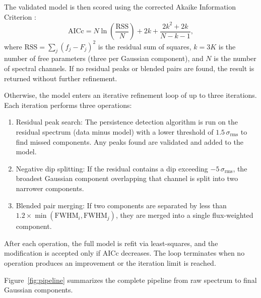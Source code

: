 \documentclass[twocolumn,twocolappendix,aj]{aastex631}
\newcommand{\srms}{\sigma_{\mathrm{rms}}}
\newcommand{\aicc}{\mathrm{AICc}}
\begin{document}
The validated model is then scored using the corrected Akaike Information
Criterion \citep{Akaike1974,Hurvich1989}:
\begin{equation}\label{eq:aicc}
  \aicc = N \ln\!\left(\frac{\mathrm{RSS}}{N}\right) + 2k
        + \frac{2k^2 + 2k}{N - k - 1},
\end{equation}
where $\mathrm{RSS} = \sum_j (f_j - F_j)^2$ is the residual sum of squares,
$k = 3K$ is the number of free parameters (three per Gaussian component),
and $N$ is the number of spectral channels.  If no residual peaks or blended
pairs are found, the result is returned without further refinement.

Otherwise, the model enters an iterative refinement loop of up to three
iterations.  Each iteration performs three operations:

\begin{enumerate}
  \item Residual peak search:  The persistence detection algorithm is
    run on the residual spectrum (data minus model) with a lower threshold of
    $1.5\,\srms$ to find missed components.  Any peaks found are validated and
    added to the model.

  \item Negative dip splitting:  If the residual contains a dip
    exceeding $-5\,\srms$, the broadest Gaussian component overlapping that
    channel is split into two narrower components.

  \item Blended pair merging:  If two components are separated by
    less than $1.2 \times \min(\mathrm{FWHM}_i, \mathrm{FWHM}_j)$, they are
    merged into a single flux-weighted component.
\end{enumerate}

After each operation, the full model is refit via least-squares, and the
modification is accepted only if $\aicc$ decreases.  The loop terminates when
no operation produces an improvement or the iteration limit is reached.

Figure~\ref{fig:pipeline} summarizes the complete pipeline from raw spectrum
to final Gaussian components.
\end{document}
